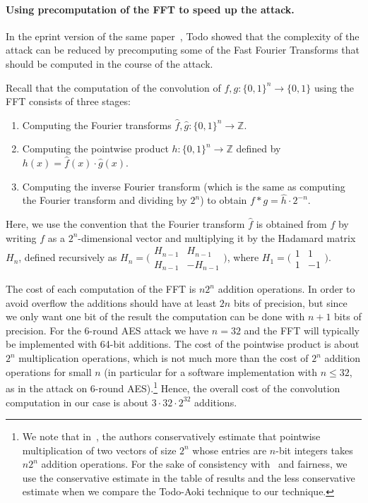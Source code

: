 \paragraph{Using precomputation of the FFT to speed up the attack.} In the eprint version of the same paper~\cite{EPRINT:Todo14}, Todo showed that the complexity of the attack can be reduced by precomputing some of the Fast Fourier Transforms that should be computed in the course of the attack.

Recall that the computation of the convolution of $f,g:\{0,1\}^n \to \{0,1\}$ using the FFT consists of three stages:
\begin{enumerate}[leftmargin=0.1in]
    \item Computing the Fourier transforms $\hat{f},\hat{g}: \{0,1\}^n \to \mathbb{Z}$.
    \item Computing the pointwise product $h:\{0,1\}^n \to \mathbb{Z}$ defined by $h(x)=\hat{f}(x) \cdot \hat{g}(x)$.
    \item Computing the inverse Fourier transform (which is the same as computing the Fourier transform and dividing by $2^n$) to obtain $f * g = \hat{h} \cdot 2^{-n}$.
\end{enumerate}
Here, we use the convention that the Fourier transform $\hat{f}$ is obtained from $f$ by writing $f$ as a $2^n$-dimensional vector and multiplying it by the Hadamard matrix $H_n$, defined recursively as $H_n=\big(\begin{smallmatrix}
  H_{n-1} & H_{n-1} \\
  H_{n-1} & -H_{n-1}
\end{smallmatrix}\big)$, where 
$H_1=\big(\begin{smallmatrix}
  1 & 1\\
  1 & -1
\end{smallmatrix}\big)$. 

The cost of each computation of the FFT is $n2^n$ addition operations.  In order to avoid overflow the additions should have at least $2n$ bits of precision, but since we only want one bit of the result the computation can be done with $n+1$ bits of precision.  For the 6-round AES attack we have $n=32$ and the FFT will typically be implemented with 64-bit additions.  The cost of the pointwise product is about $2^n$ multiplication operations, which is not much more than the cost of $2^n$ addition operations for small $n$ (in particular for a software implementation with $n \leq 32$, as in the attack on 6-round AES).\footnote{We note that in~\cite{CANS:TodAok14}, the authors conservatively estimate that pointwise multiplication of two vectors of size $2^n$ whose entries are $n$-bit integers takes $n2^n$ addition operations. For the sake of consistency with~\cite{CANS:TodAok14} and fairness, we use the conservative estimate in the table of results and the less conservative estimate when we compare the Todo-Aoki technique to our technique.} Hence, the overall cost of the convolution computation in our case is about $3 \cdot 32 \cdot 2^{32}$ additions.   

